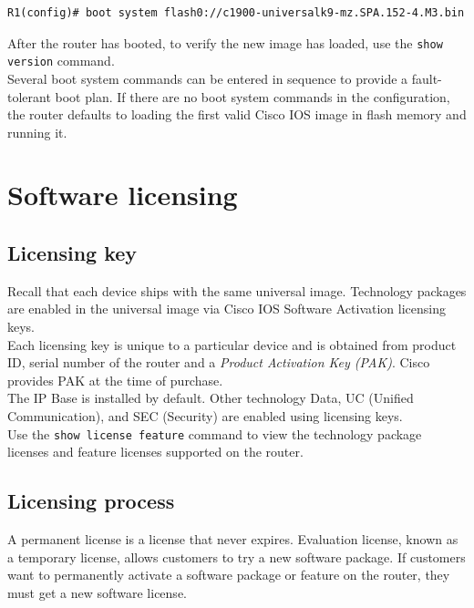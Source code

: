 \begin{verbatim}
R1(config)# boot system flash0://c1900-universalk9-mz.SPA.152-4.M3.bin
\end{verbatim}

After the router has booted, to verify the new image has loaded, use the \verb|show version| command.\\

Several boot system commands can be entered in sequence to provide a fault-tolerant boot plan. If there are no boot system commands in the configuration, the router defaults to loading the first valid Cisco IOS image in flash memory and running it.

\section{Software licensing}

\subsection{Licensing key}

Recall that each device ships with the same universal image. Technology packages are enabled in the
universal image via Cisco IOS Software Activation licensing keys. \\

Each licensing key is unique to a particular device and is obtained from product ID, serial number of the router and a \emph{Product Activation Key (PAK)}. Cisco provides PAK at the time of purchase. \\

The IP Base is installed by default. Other technology Data, UC (Unified Communication), and SEC (Security) are enabled using licensing keys.\\

Use the \verb|show license feature| command to view the technology package licenses and feature licenses supported on the router.

\subsection{Licensing process}

A permanent license is a license that never expires. Evaluation license, known as a temporary license, allows customers to try a new software package. If customers want to permanently activate a software package or feature on the router, they must get a new software license.\\

